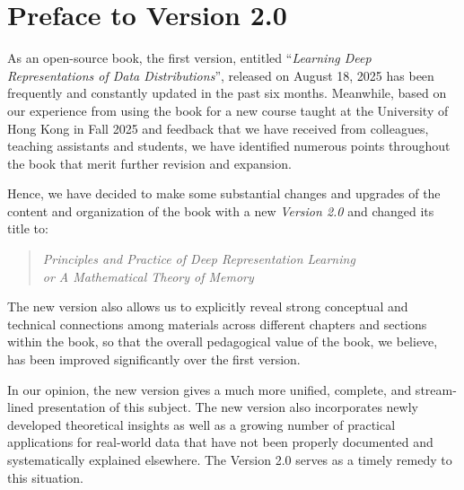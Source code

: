 \documentclass[../../book-main.tex]{subfiles}
\begin{document}
\chapter*{Preface to Version 2.0}



As an open-source book, the first version, entitled ``{\em Learning Deep Representations of Data Distributions}'', released on August 18, 2025 has been frequently and constantly updated in the past six months. Meanwhile, based on
our experience from using the book for a new course taught at the University of
Hong Kong in Fall 2025 and feedback that we have received from colleagues, teaching assistants and students, we have identified numerous points throughout the book that merit further revision and expansion.

Hence, we have decided to make some substantial changes and upgrades of the content and organization of the book with a new \textit{Version 2.0} and changed its title to:
\begin{quote}
    \centering 
    {\em Principles and Practice of Deep Representation Learning} \\
    {\em or A Mathematical Theory of Memory}
\end{quote}
The new version also allows us to explicitly reveal strong conceptual and technical connections among materials across different chapters and sections within the book, so that the overall pedagogical value of the book, we believe, has been improved significantly over the first version. 

In our opinion, the new version gives a much more unified, complete, and stream-lined presentation of this subject. The new version also incorporates newly developed theoretical insights as well as a growing number of practical applications for real-world data that have not been properly documented and systematically explained elsewhere. The Version 2.0 serves as a timely remedy to this situation.
\end{document}
